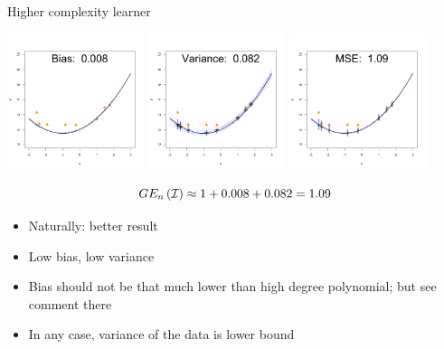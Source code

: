 \documentclass[11pt,compress,t,notes=noshow, xcolor=table]{beamer}
\begin{document}
\begin{vbframe} {Higher complexity learner}

\begin{center}
  \includegraphics[width = 0.3\textwidth]{figure/bias_variance_decomposition-correct_model_bias.png}
  \includegraphics[width = 0.3\textwidth]{figure/bias_variance_decomposition-correct_model_variance.png}
  \includegraphics[width = 0.3\textwidth]{figure/bias_variance_decomposition-correct_model_mse.png}
\end{center}

$$GE_n\left(\mathcal{I}\right) \approx 1 + 0.008 + 0.082 = 1.09 $$

\begin{itemize}
  \item Naturally: better result
  \item Low bias, low variance
  \item Bias should not be that much lower than
  high degree polynomial; but see comment there
  \item In any case, variance of the data is lower bound
\end{itemize}
 

\end{vbframe}
\end{document}

